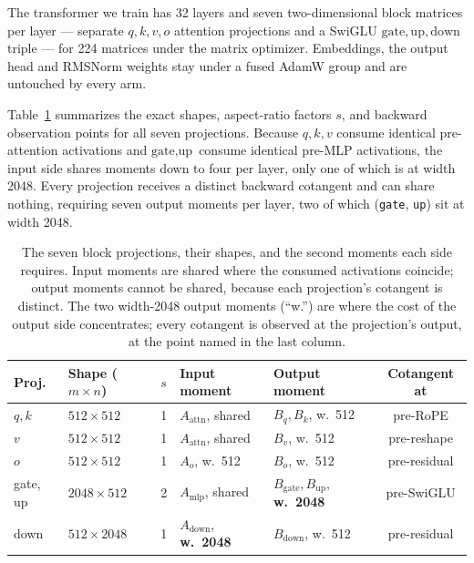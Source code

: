 The transformer we train has 32 layers and seven two-dimensional block matrices
per layer --- separate $q,k,v,o$ attention projections and a SwiGLU
$\text{gate},\text{up},\text{down}$ triple --- for 224 matrices under the matrix
optimizer. Embeddings, the output head and RMSNorm weights stay under a fused
AdamW group and are untouched by every arm.

Table~\ref{tab:projections} summarizes the exact shapes, aspect-ratio factors
$s$, and backward observation points for all seven projections. Because $q,k,v$
consume identical pre-attention activations and $\text{gate},\text{up}$ consume
identical pre-MLP activations, the input side shares moments down to four per
layer, only one of which is at width 2048. Every projection receives a distinct
backward cotangent and can share nothing, requiring seven output moments per
layer, two of which (\texttt{gate}, \texttt{up}) sit at width 2048.

\begin{table}[t]
\centering
\caption{The seven block projections, their shapes, and the second moments each
side requires. Input moments are shared where the consumed activations
coincide; output moments cannot be shared, because each projection's cotangent
is distinct. The two width-2048 output moments (``w.'') are where the cost of the
output side concentrates; every cotangent is observed at the projection's
output, at the point named in the last column.}
\label{tab:projections}
\footnotesize\setlength{\tabcolsep}{5.5pt}
\begin{tabular}{@{}llcllc@{}}
\toprule
Proj. & Shape ($m\times n$) & $s$ & Input moment & Output moment & Cotangent at \\
\midrule
$q,k$ & $512\times512$ & 1 & $A_{\text{attn}}$, shared & $B_q,B_k$, w.\ 512 & pre-RoPE \\
$v$ & $512\times512$ & 1 & $A_{\text{attn}}$, shared & $B_v$, w.\ 512 & pre-reshape \\
$o$ & $512\times512$ & 1 & $A_o$, w.\ 512 & $B_o$, w.\ 512 & pre-residual \\
gate, up & $2048\times512$ & 2 & $A_{\text{mlp}}$, shared & $B_{\text{gate}},B_{\text{up}}$, \textbf{w.\ 2048} & pre-SwiGLU \\
down & $512\times2048$ & 1 & $A_{\text{down}}$, \textbf{w.\ 2048} & $B_{\text{down}}$, w.\ 512 & pre-residual \\
\bottomrule
\end{tabular}
\end{table}

